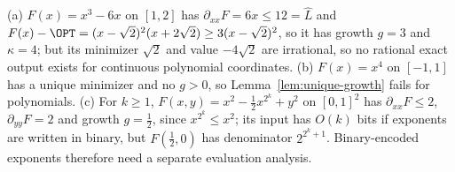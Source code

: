 \begin{example}\label{ex:polylimits}
(a) $F(x)=x^3-6x$ on $[1,2]$ has $\partial_{xx}F=6x\le12=\hat L$ and
$F(x)-\OPT=(x-\sqrt2)^2(x+2\sqrt2)\ge3(x-\sqrt2)^2$, so it has growth $g=3$
and $\kappa=4$; but its minimizer $\sqrt2$ and value $-4\sqrt2$ are
irrational, so no rational exact output exists for continuous polynomial
coordinates. (b) $F(x)=x^4$ on $[-1,1]$ has a unique minimizer and no
$g>0$, so Lemma~\ref{lem:unique-growth} fails for polynomials.
(c) For $k\ge1$, $F(x,y)=x^2-\frac12x^{2^k}+y^2$ on $[0,1]^2$ has
$\partial_{xx}F\le2$, $\partial_{yy}F=2$ and growth $g=\frac12$, since
$x^{2^k}\le x^2$; its input has $O(k)$ bits if exponents are written in
binary, but $F(\frac12,0)$ has denominator $2^{2^k+1}$. Binary-encoded
exponents therefore need a separate evaluation analysis.
\end{example}
